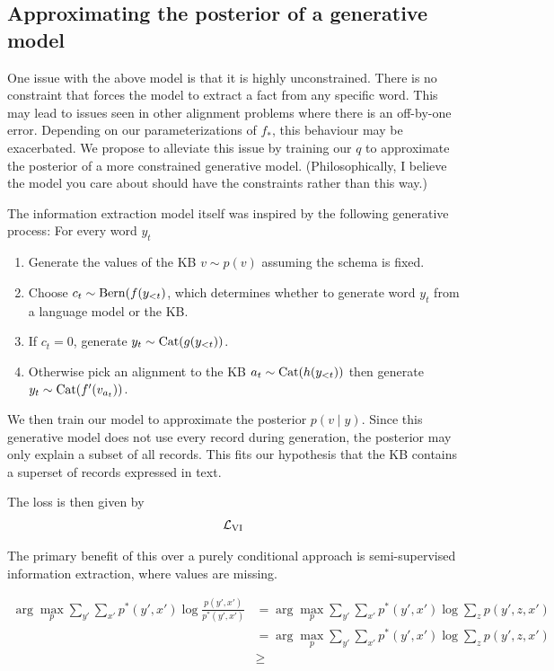 \documentclass[12pt]{article}
\begin{document}
\subsection{Approximating the posterior of a generative model}
One issue with the above model is that it is highly unconstrained.
There is no constraint that forces the model to extract a fact from any specific word.
This may lead to issues seen in other alignment problems where there is an
off-by-one error.
Depending on our parameterizations of $f_{*}$, this behaviour may be exacerbated.
We propose to alleviate this issue by training our $q$ to approximate the posterior of
a more constrained generative model.
(Philosophically, I believe the model you care about should have the constraints
rather than this way.)

The information extraction model itself was inspired by the following generative process:
For every word $y_t$
\begin{enumerate}
\item Generate the values of the KB $v \sim p(v)$ assuming the schema is fixed.
\item Choose $c_t \sim \mathrm{Bern}(f(y_{<t})$, which determines whether to generate 
    word $y_t$ from a language model or the KB.
\item If $c_t = 0$, generate $y_t \sim \mathrm{Cat}(g(y_{<t}))$.
\item Otherwise pick an alignment to the KB $a_t \sim \mathrm{Cat}(h(y_{<t}))$
    then generate $y_t \sim \mathrm{Cat}(f'(v_{a_t}))$.
\end{enumerate}
We then train our model to approximate the posterior $p(v \mid y)$.
Since this generative model does not use every record during generation,
the posterior may only explain a subset of all records.
This fits our hypothesis that the KB contains a superset of records expressed in text.

The loss is then given by
\begin{align*}
\mathcal{L}_{\textrm{VI}}
\end{align*}

The primary benefit of this over a purely conditional approach is semi-supervised information extraction,
where values are missing.

\begin{align}
\arg\max_p \sum_{y'}\sum_{x'} p^*(y',x')\log \frac{p(y',x')}{p^*(y',x')}
&= \arg\max_p \sum_{y'}\sum_{x'} p^*(y',x')\log \sum_z p(y',z,x')\\
&= \arg\max_p \sum_{y'}\sum_{x'} p^*(y',x')\log \sum_z p(y',z,x')\\
&\geq 
\end{align}



\end{document}
